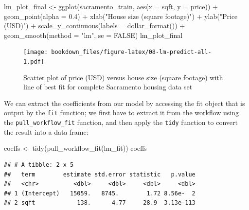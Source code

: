 \documentclass[
]{krantz}
\makeatletter
\newenvironment{Shaded}{\begin{snugshade}}{\end{snugshade}}
\newcommand{\AttributeTok}[1]{\textcolor[rgb]{0.61,0.61,0.61}{#1}}
\newcommand{\ConstantTok}[1]{\textcolor[rgb]{0,0,0}{#1}}
\newcommand{\FloatTok}[1]{\textcolor[rgb]{0.06,0.06,0.06}{#1}}
\newcommand{\FunctionTok}[1]{\textcolor[rgb]{0,0,0}{#1}}
\newcommand{\NormalTok}[1]{#1}
\newcommand{\OtherTok}[1]{\textcolor[rgb]{0.37,0.37,0.37}{#1}}
\newcommand{\SpecialCharTok}[1]{\textcolor[rgb]{0,0,0}{#1}}
\newcommand{\StringTok}[1]{\textcolor[rgb]{0.5,0.5,0.5}{#1}}
\newenvironment{kframe}{%
\medskip{}
\setlength{\fboxsep}{.8em}
 \def\at@end@of@kframe{}%
 \ifinner\ifhmode%
  \def\at@end@of@kframe{\end{minipage}}%
  \begin{minipage}{\columnwidth}%
 \fi\fi%
 \def\FrameCommand##1{\hskip\@totalleftmargin \hskip-\fboxsep
 \colorbox{shadecolor}{##1}\hskip-\fboxsep
     \hskip-\linewidth \hskip-\@totalleftmargin \hskip\columnwidth}%
 \MakeFramed {\advance\hsize-\width
   \@totalleftmargin\z@ \linewidth\hsize
   \@setminipage}}%
 {\par\unskip\endMakeFramed%
 \at@end@of@kframe}
\renewenvironment{Shaded}{\begin{kframe}}{\end{kframe}}
\makeatother
\begin{document}
\begin{Shaded}
\begin{Highlighting}[]
\NormalTok{lm\_plot\_final }\OtherTok{\textless{}{-}} \FunctionTok{ggplot}\NormalTok{(sacramento\_train, }\FunctionTok{aes}\NormalTok{(}\AttributeTok{x =}\NormalTok{ sqft, }\AttributeTok{y =}\NormalTok{ price)) }\SpecialCharTok{+}
  \FunctionTok{geom\_point}\NormalTok{(}\AttributeTok{alpha =} \FloatTok{0.4}\NormalTok{) }\SpecialCharTok{+}
  \FunctionTok{xlab}\NormalTok{(}\StringTok{"House size (square footage)"}\NormalTok{) }\SpecialCharTok{+}
  \FunctionTok{ylab}\NormalTok{(}\StringTok{"Price (USD)"}\NormalTok{) }\SpecialCharTok{+}
  \FunctionTok{scale\_y\_continuous}\NormalTok{(}\AttributeTok{labels =} \FunctionTok{dollar\_format}\NormalTok{()) }\SpecialCharTok{+}
  \FunctionTok{geom\_smooth}\NormalTok{(}\AttributeTok{method =} \StringTok{"lm"}\NormalTok{, }\AttributeTok{se =} \ConstantTok{FALSE}\NormalTok{)}
\NormalTok{lm\_plot\_final}
\end{Highlighting}
\end{Shaded}

\begin{figure}
\centering
\texttt{[image: bookdown\_files/figure-latex/08-lm-predict-all-1.pdf]}
\caption{\label{fig:08-lm-predict-all}Scatter plot of price (USD) versus house size (square footage) with line of best fit for complete Sacramento housing data set}
\end{figure}

We can extract the coefficients from our model by accessing the
fit object that is output by the \texttt{fit} function; we first have to extract
it from the workflow using the \texttt{pull\_workflow\_fit} function, and then apply
the \texttt{tidy} function to convert the result into a data frame:

\begin{Shaded}
\begin{Highlighting}[]
\NormalTok{coeffs }\OtherTok{\textless{}{-}} \FunctionTok{tidy}\NormalTok{(}\FunctionTok{pull\_workflow\_fit}\NormalTok{(lm\_fit))}
\NormalTok{coeffs}
\end{Highlighting}
\end{Shaded}

\begin{verbatim}
## # A tibble: 2 x 5
##   term        estimate std.error statistic   p.value
##   <chr>          <dbl>     <dbl>     <dbl>     <dbl>
## 1 (Intercept)   15059.   8745.        1.72 8.56e-  2
## 2 sqft            138.      4.77     28.9  3.13e-113
\end{verbatim}
\end{document}
